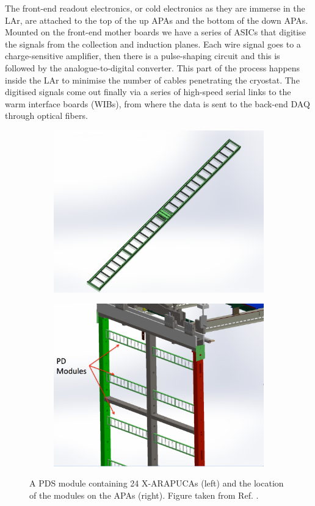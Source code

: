 The front-end readout electronics, or cold electronics as they are immerse in the LAr, are attached to the top of the up APAs and the bottom of the down APAs. Mounted on the front-end mother boards we have a series of ASICs that digitise the signals from the collection and induction planes. Each wire signal goes to a charge-sensitive amplifier, then there is a pulse-shaping circuit and this is followed by the analogue-to-digital converter. This part of the process happens inside the LAr to minimise the number of cables penetrating the cryostat. The digitised signals come out finally via a series of high-speed serial links to the warm interface boards (WIBs), from where the data is sent to the back-end DAQ through optical fibers.

\begin{figure}[t]
	\begin{subfigure}{0.49\textwidth}
		\centering
		\includegraphics[width=.90\linewidth]{Images/DUNE/FD/pds-module}
	\end{subfigure}
	\begin{subfigure}{0.49\textwidth}
		\centering
		\includegraphics[width=.90\linewidth]{Images/DUNE/FD/pds-in-apa-assembly}
	\end{subfigure}
	\caption[A PDS module containing 24 X-ARAPUCAs and the location of the modules on the APAs.]{A PDS module containing 24 X-ARAPUCAs (left) and the location of the modules on the APAs (right). Figure taken from Ref. \cite{DUNE2020TDR1}.}
	\label{fig:dune_pds}
\end{figure}

